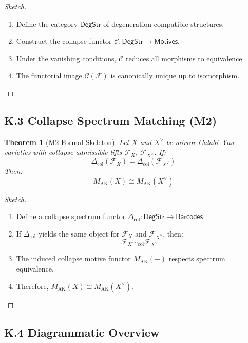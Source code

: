 \documentclass[11pt]{article}
\newtheorem{theorem}{Theorem}[section]
\begin{document}
\begin{proof}[Sketch]
\begin{enumerate}
  \item Define the category $\mathsf{DegStr}$ of degeneration-compatible structures.
  \item Construct the collapse functor $\mathcal{C}: \mathsf{DegStr} \to \mathsf{Motives}$.
  \item Under the vanishing conditions, $\mathcal{C}$ reduces all morphisms to equivalence.
  \item The functorial image $\mathcal{C}(\mathcal{F})$ is canonically unique up to isomorphism.
\end{enumerate}
\end{proof}

\subsection*{K.3 Collapse Spectrum Matching (M2)}

\begin{theorem}[M2 Formal Skeleton]
Let $X$ and $X^\vee$ be mirror Calabi–Yau varieties with collapse-admissible lifts $\mathcal{F}_X$, $\mathcal{F}_{X^\vee}$. If:
\[
\Delta_{\mathrm{col}}(\mathcal{F}_X) = \Delta_{\mathrm{col}}(\mathcal{F}_{X^\vee})
\]
Then:
\[
M_{\mathrm{AK}}(X) \cong M_{\mathrm{AK}}(X^\vee)
\]
\end{theorem}

\begin{proof}[Sketch]
\begin{enumerate}
  \item Define a collapse spectrum functor $\Delta_{\mathrm{col}}: \mathsf{DegStr} \to \mathsf{Barcodes}$.
  \item If $\Delta_{\mathrm{col}}$ yields the same object for $\mathcal{F}_X$ and $\mathcal{F}_{X^\vee}$, then:
  \[
  \mathcal{F}_X \sim_{\mathrm{col}} \mathcal{F}_{X^\vee}
  \]
  \item The induced collapse motive functor $M_{\mathrm{AK}}(-)$ respects spectrum equivalence.
  \item Therefore, $M_{\mathrm{AK}}(X) \cong M_{\mathrm{AK}}(X^\vee)$.
\end{enumerate}
\end{proof}

\subsection*{K.4 Diagrammatic Overview}
\end{document}
